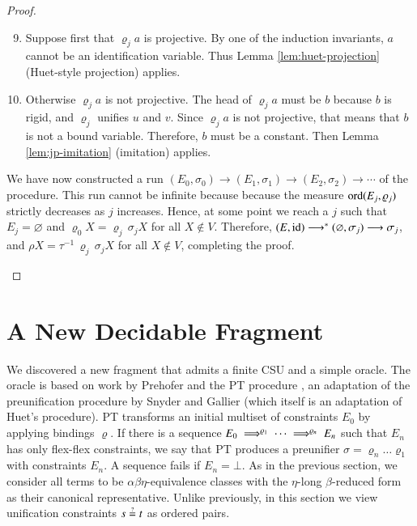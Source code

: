 \begin{proof}
\begin{description}
    \begin{enumerate}
    \setcounter{enumi}{8}
    \item Suppose first that $\varrho_j a$ is projective.
    By one of the induction invariants, $a$ cannot be an identification variable.
    Thus Lemma \ref{lem:huet-projection} (Huet-style projection) applies.
    
    \item Otherwise $\varrho_j a$ is not projective. 
    The head of $\varrho_j a$ must be $b$ because $b$ is rigid, and $\varrho_j$ unifies $u$ and $v$. 
    Since $\varrho_j a$ is not projective, that means that $b$ is not a bound variable. 
    Therefore, $b$ must be a constant.
    Then Lemma \ref{lem:jp-imitation} (imitation) applies.
    \end{enumerate}
    
    We have now constructed a run 
    $(E_{0},\sigma_{0})\longrightarrow(E_{1},\sigma_{1})\longrightarrow(E_{2},\sigma_{2})\longrightarrow\cdots$
    of the procedure. 
    This run cannot be infinite because because the measure $\operatorname{ord}(E_j,\varrho_{j})$
    strictly decreases as $j$ increases.
    Hence, at some point we reach a $j$ such
    that $E_{j}=\varnothing$ and $\varrho_{0} X = \varrho_{j}\,\sigma_{j} X$ for all $X \not\in V$.
    Therefore, 
    $(E,\operatorname{id})\longrightarrow^*(\varnothing,\sigma_{j})\longrightarrow\sigma_j$,
    and $\rho X = \tau^{-1}\,\varrho_{j}\,\sigma_{j} X$ for all $X \not\in V$,
    completing the proof. \qedhere
    \end{description}
    \end{proof}

\pagebreak[2]    
\section{A New Decidable Fragment}
\label{sec:unif:solid-oracle}

We discovered a new fragment that admits a finite CSU and a simple oracle. The
oracle is based on work by Prehofer and the PT procedure \cite{cp-95-unifphd},
an adaptation of the preunification procedure by Snyder and Gallier
\cite{sg-89-unif} (which itself is an adaptation of Huet's procedure). PT
transforms an initial multiset of constraints $E_0$ by applying bindings
$\varrho$. If there is a sequence
$E_0\;\Longrightarrow^{\varrho_1}\;\cdots\;\Longrightarrow^{\varrho_n}\;E_n$ such that $E_n$ has only
flex-flex constraints, we say that PT produces a preunifier $\sigma =
\varrho_n\ldots\varrho_1$ with constraints $E_n$. A sequence fails if
$E_n=\bot$. As in the previous section, we consider all terms to be
$\alpha\beta\eta$-equivalence classes with the $\eta$-long $\beta$-reduced form
as their canonical representative. Unlike previously, in this section we view
unification constraints $s \unif t$ as ordered pairs.

